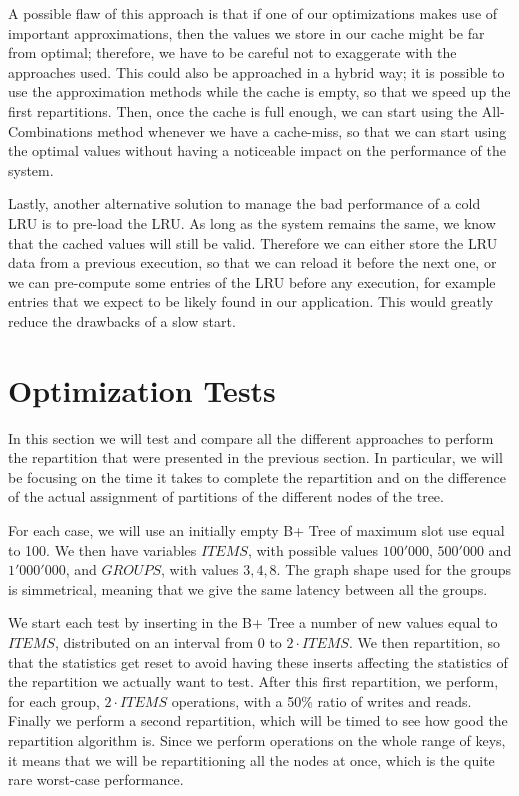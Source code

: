 A possible flaw of this approach is that if one of our optimizations makes use of important approximations, then the values we store in our cache might be far from optimal; therefore, we have to be careful not to exaggerate with the approaches used. This could also be approached in a hybrid way; it is possible to use the approximation methods while the cache is empty, so that we speed up the first repartitions. Then, once the cache is full enough, we can start using the All-Combinations method whenever we have a cache-miss, so that we can start using the optimal values without having a noticeable impact on the performance of the system.

Lastly, another alternative solution to manage the bad performance of a cold LRU is to pre-load the LRU. As long as the system remains the same, we know that the cached values will still be valid. Therefore we can either store the LRU data from a previous execution, so that we can reload it before the next one, or we can pre-compute some entries of the LRU before any execution, for example entries that we expect to be likely found in our application. This would greatly reduce the drawbacks of a slow start.

\section{Optimization Tests}\label{sec:optimization-tests}
In this section we will test and compare all the different approaches to perform the repartition that were presented in the previous section. 
In particular, we will be focusing on the time it takes to complete the repartition and on the difference of the actual assignment of partitions of the different nodes of the tree.

For each case, we will use an initially empty B+ Tree of maximum slot use equal to 100. We then have variables $ITEMS$, with possible values $100'000$, $500'000$ and $1'000'000$, and $GROUPS$, with values $3, 4, 8$. The graph shape used for the groups is simmetrical, meaning that we give the same latency between all the groups.

We start each test by inserting in the B+ Tree a number of new values equal to $ITEMS$, distributed on an interval from 0 to $2\cdot ITEMS$. We then repartition, so that the statistics get reset to avoid having these inserts affecting the statistics of the repartition we actually want to test. After this first repartition, we perform, for each group, $2\cdot ITEMS$ operations, with a 50\% ratio of writes and reads. Finally we perform a second repartition, which will be timed to see how good the repartition algorithm is. Since we perform operations on the whole range of keys, it means that we will be repartitioning all the nodes at once, which is the quite rare worst-case performance.

